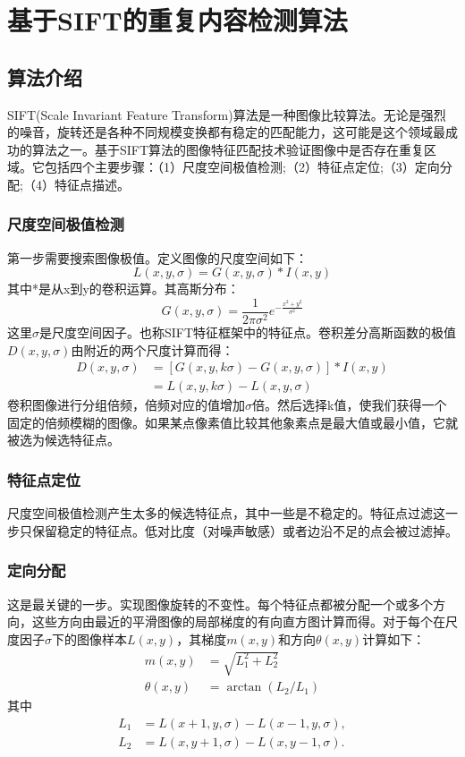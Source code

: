 \documentclass[a4paper, 10pt, notitlepage]{report}
\begin{document}
	\section{基于SIFT的重复内容检测算法}
		\subsection{算法介绍}
			SIFT(Scale Invariant Feature Transform)算法是一种图像比较算法。无论是强烈的噪音，旋转还是各种不同规模变换都有稳定的匹配能力，这可能是这个领域最成功的算法之一。基于SIFT算法的图像特征匹配技术验证图像中是否存在重复区域。它包括四个主要步骤：（1）尺度空间极值检测;（2）特征点定位;（3）定向分配;（4）特征点描述。

			\subsubsection{尺度空间极值检测}
			第一步需要搜索图像极值。定义图像的尺度空间如下：
			\begin{equation}
				L(x, y, \sigma) = G(x,y,\sigma)* I(x, y)
			\end{equation}
			其中*是从x到y的卷积运算。其高斯分布：
			\begin{equation}
				G(x,y,\sigma) = \frac{1}{2\pi\sigma^2}e^{-\frac{x^2 + y^2}{\sigma^2}}
			\end{equation}
			这里$\sigma$是尺度空间因子。也称SIFT特征框架中的特征点。卷积差分高斯函数的极值$D(x,y,\sigma)$由附近的两个尺度计算而得：
			\begin{equation}
				\begin{split}
					D(x,y,\sigma) &= [G(x,y,k\sigma)-G(x,y,\sigma)]*I(x,y) \\
							&= L(x,y,k\sigma)-L(x,y,\sigma)
				\end{split}
			\end{equation}
			卷积图像进行分组倍频，倍频对应的值增加$\sigma$倍。然后选择k值，使我们获得一个固定的倍频模糊的图像。如果某点像素值比较其他象素点是最大值或最小值，它就被选为候选特征点。

			\subsubsection{特征点定位}
			尺度空间极值检测产生太多的候选特征点，其中一些是不稳定的。特征点过滤这一步只保留稳定的特征点。低对比度（对噪声敏感）或者边沿不足的点会被过滤掉。

			\subsubsection{定向分配}
			这是最关键的一步。实现图像旋转的不变性。每个特征点都被分配一个或多个方向，这些方向由最近的平滑图像的局部梯度的有向直方图计算而得。对于每个在尺度因子$\sigma$下的图像样本$L(x,y)$，其梯度$m(x,y)$和方向$\theta(x,y)$计算如下：
			\begin{align}
				m(x,y) &= \sqrt{L_1^2 + L_2^2} \\
				\theta(x,y) &= \arctan (L_2/L_1)
			\end{align}
			其中
			\begin{align}
				L_1 &= L(x+1,y,\sigma)-L(x-1,y,\sigma), \\
				L_2 &= L(x,y+1,\sigma)-L(x,y-1,\sigma).
			\end{align}
			
\end{document}
